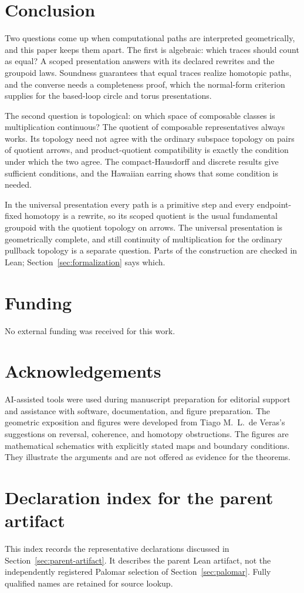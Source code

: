 \documentclass[10pt,reqno]{amsart}
\theoremstyle{definition}
\theoremstyle{plain}
\theoremstyle{remark}
\begin{document}
\section{Conclusion}
\label{sec:conclusion}

Two questions come up when computational paths are interpreted
geometrically, and this paper keeps them apart.  The first is algebraic:
which traces should count as equal?  A scoped presentation answers with its
declared rewrites and the groupoid laws.  Soundness guarantees that equal
traces realize homotopic paths, and the converse needs a completeness proof,
which the normal-form criterion supplies for the based-loop circle and torus
presentations.

The second question is topological: on which space of composable classes is
multiplication continuous?  The quotient of composable representatives always
works.  Its topology need not agree with the ordinary subspace topology on
pairs of quotient arrows, and product-quotient compatibility is exactly the
condition under which the two agree.  The compact-Hausdorff and discrete
results give sufficient conditions, and the Hawaiian earring shows that some
condition is needed.

In the universal presentation every path is a primitive step and every
endpoint-fixed homotopy is a rewrite, so its scoped quotient is the usual
fundamental groupoid with the quotient topology on arrows.  The universal
presentation is geometrically complete, and still continuity of
multiplication for the ordinary pullback topology is a separate question.
Parts of the construction are checked in Lean; Section~\ref{sec:formalization} says which.

\section*{Funding}
No external funding was received for this work.

\section*{Acknowledgements}
AI-assisted tools were used during manuscript preparation for editorial
support and assistance with software, documentation, and figure preparation.
The geometric exposition and figures were developed from Tiago M.~L.~de
Veras's suggestions on reversal, coherence, and homotopy obstructions.
The figures are mathematical schematics with explicitly stated maps and
boundary conditions.  They illustrate the arguments and are not offered as
evidence for the theorems.

\clearpage
\appendix
\section{Declaration index for the parent artifact}\label{app:declarations}
This index records the representative declarations discussed in Section~\ref{sec:parent-artifact}.
It describes the parent Lean artifact, not the independently registered
Palomar selection of Section~\ref{sec:palomar}.  Fully qualified names are retained for
source lookup.

\clearpage

\begingroup
\small

\endgroup
\end{document}
